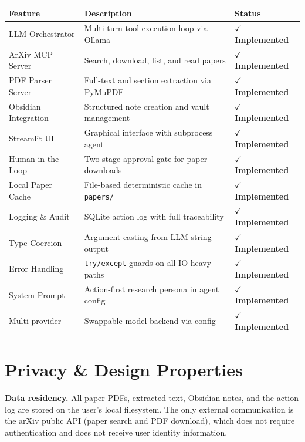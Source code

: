 \documentclass[12pt, a4paper]{article}
\newcommand{\code}[1]{\texttt{\small\color{darwinblue}#1}}
\newcommand{\done}{\textbf{\color{okgreen}$\checkmark$ Implemented}}
\begin{document}
\begin{center}
\renewcommand{\arraystretch}{1.4}
\begin{tabular}{p{4.2cm} p{8.0cm} l}
    \toprule
    \textbf{Feature} & \textbf{Description} & \textbf{Status} \\
    \midrule
    LLM Orchestrator      & Multi-turn tool execution loop via Ollama          & \done \\
    ArXiv MCP Server      & Search, download, list, and read papers            & \done \\
    PDF Parser Server     & Full-text and section extraction via PyMuPDF       & \done \\
    Obsidian Integration  & Structured note creation and vault management      & \done \\
    Streamlit UI          & Graphical interface with subprocess agent          & \done \\
    Human-in-the-Loop     & Two-stage approval gate for paper downloads        & \done \\
    Local Paper Cache     & File-based deterministic cache in \code{papers/}  & \done \\
    Logging \& Audit      & SQLite action log with full traceability           & \done \\
    Type Coercion         & Argument casting from LLM string output            & \done \\
    Error Handling        & \texttt{try/except} guards on all IO-heavy paths   & \done \\
    System Prompt         & Action-first research persona in agent config      & \done \\
    Multi-provider        & Swappable model backend via config                 & \done \\
    \bottomrule
\end{tabular}
\end{center}

\section{Privacy \& Design Properties}

\begin{infobox}
\textbf{Data residency.} All paper PDFs, extracted text, Obsidian notes, and the action log are stored on the user's local filesystem. The only external communication is the arXiv public API (paper search and PDF download), which does not require authentication and does not receive user identity information.
\end{infobox}
\end{document}
